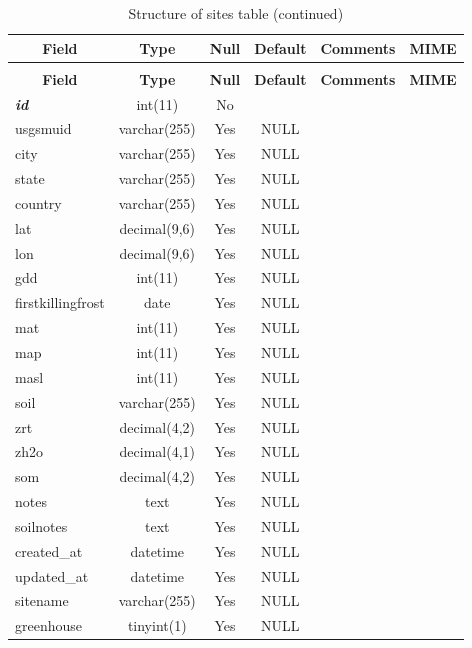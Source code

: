 \begin{enumerate}
%
%
 \begin{longtable}{|l|c|c|c|l|l|} 
 \caption{Structure of sites table} \label{tab:sites} \\
 \hline \multicolumn{1}{|c|}{\textbf{Field}} & \multicolumn{1}{|c|}{\textbf{Type}} & \multicolumn{1}{|c|}{\textbf{Null}} & \multicolumn{1}{|c|}{\textbf{Default}} & \multicolumn{1}{|c|}{\textbf{Comments}} & \multicolumn{1}{|c|}{\textbf{MIME}} \\ \hline \hline
\endfirsthead
 \caption{Structure of sites table (continued)} \\ 
 \hline \multicolumn{1}{|c|}{\textbf{Field}} & \multicolumn{1}{|c|}{\textbf{Type}} & \multicolumn{1}{|c|}{\textbf{Null}} & \multicolumn{1}{|c|}{\textbf{Default}} & \multicolumn{1}{|c|}{\textbf{Comments}} & \multicolumn{1}{|c|}{\textbf{MIME}} \\ \hline \hline \endhead \endfoot 
\textbf{\textit{id}} & int(11) & No &  &  &  \\ \hline 
usgsmuid & varchar(255) & Yes & NULL &  &  \\ \hline 
city & varchar(255) & Yes & NULL &  &  \\ \hline 
state & varchar(255) & Yes & NULL &  &  \\ \hline 
country & varchar(255) & Yes & NULL &  &  \\ \hline 
lat & decimal(9,6) & Yes & NULL &  &  \\ \hline 
lon & decimal(9,6) & Yes & NULL &  &  \\ \hline 
gdd & int(11) & Yes & NULL &  &  \\ \hline 
firstkillingfrost & date & Yes & NULL &  &  \\ \hline 
mat & int(11) & Yes & NULL &  &  \\ \hline 
map & int(11) & Yes & NULL &  &  \\ \hline 
masl & int(11) & Yes & NULL &  &  \\ \hline 
soil & varchar(255) & Yes & NULL &  &  \\ \hline 
zrt & decimal(4,2) & Yes & NULL &  &  \\ \hline 
zh2o & decimal(4,1) & Yes & NULL &  &  \\ \hline 
som & decimal(4,2) & Yes & NULL &  &  \\ \hline 
notes & text & Yes & NULL &  &  \\ \hline 
soilnotes & text & Yes & NULL &  &  \\ \hline 
created\_at & datetime & Yes & NULL &  &  \\ \hline 
updated\_at & datetime & Yes & NULL &  &  \\ \hline 
sitename & varchar(255) & Yes & NULL &  &  \\ \hline 
greenhouse & tinyint(1) & Yes & NULL &  &  \\ \hline 
 \end{longtable}



\end{enumerate}
